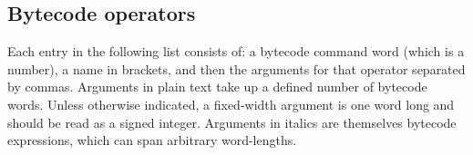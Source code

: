 \documentclass{article}
\begin{document}

\subsection{Bytecode operators}  

Each entry in the following list consists of:  a bytecode command word (which is a number), a name in brackets, and then the arguments for that operator separated by commas.  Arguments in plain text take up a defined number of bytecode words.  Unless otherwise indicated, a fixed-width argument is one word long and should be read as a signed integer.  Arguments in italics are themselves bytecode expressions, which can span arbitrary word-lengths.\\
\end{document}
